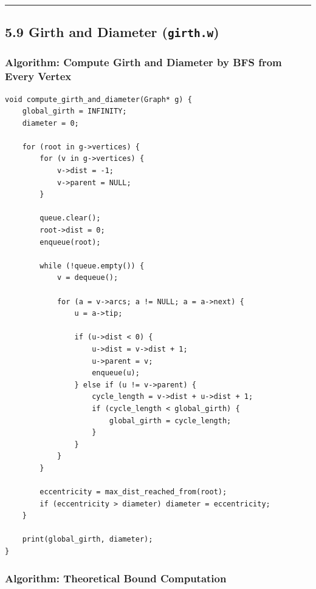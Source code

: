 \documentclass[11pt]{article}
\begin{document}
\begin{center}\rule{0.5\linewidth}{0.5pt}\end{center}

\subsection{\texorpdfstring{5.9 Girth and Diameter (\texttt{girth.w})}{5.9 Girth and Diameter (girth.w)}}\label{girth-and-diameter-girth.w}

\subsubsection{Algorithm: Compute Girth and Diameter by BFS from Every Vertex}\label{algorithm-compute-girth-and-diameter-by-bfs-from-every-vertex}

\begin{verbatim}
void compute_girth_and_diameter(Graph* g) {
    global_girth = INFINITY;
    diameter = 0;

    for (root in g->vertices) {
        for (v in g->vertices) {
            v->dist = -1;
            v->parent = NULL;
        }

        queue.clear();
        root->dist = 0;
        enqueue(root);

        while (!queue.empty()) {
            v = dequeue();

            for (a = v->arcs; a != NULL; a = a->next) {
                u = a->tip;

                if (u->dist < 0) {
                    u->dist = v->dist + 1;
                    u->parent = v;
                    enqueue(u);
                } else if (u != v->parent) {
                    cycle_length = v->dist + u->dist + 1;
                    if (cycle_length < global_girth) {
                        global_girth = cycle_length;
                    }
                }
            }
        }

        eccentricity = max_dist_reached_from(root);
        if (eccentricity > diameter) diameter = eccentricity;
    }

    print(global_girth, diameter);
}
\end{verbatim}

\subsubsection{Algorithm: Theoretical Bound Computation}\label{algorithm-theoretical-bound-computation}
\end{document}
